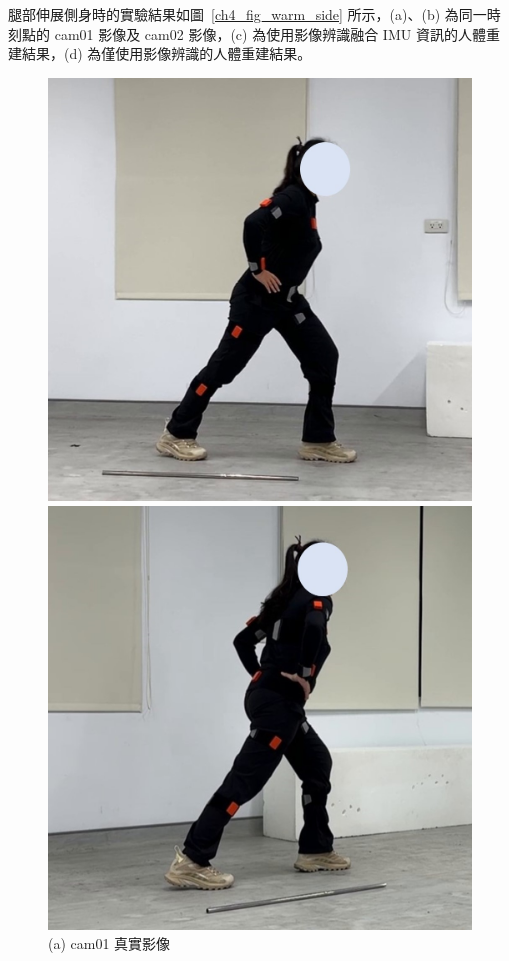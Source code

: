 \clearpage

腿部伸展側身時的實驗結果如圖~\ref{ch4_fig_warm_side} 所示，(a)、(b) 為同一時刻點的 cam01 影像及 cam02 影像，(c) 為使用影像辨識融合 IMU 資訊的人體重建結果，(d) 為僅使用影像辨識的人體重建結果。

\begin{figure}[!ht]
   \centering
   \begin{minipage}{.5\textwidth}
      \centering
      \includegraphics[width=.95\linewidth]{figure/ch4_fig_warm_cam01_with2.jpg}
      \caption*{(a) cam01 真實影像}
    \end{minipage}%
    \begin{minipage}{.5\textwidth}
       \centering
       \includegraphics[width=.95\linewidth]{figure/ch4_fig_warm_cam02_with2.jpg}

\end{minipage}
\end{figure}
